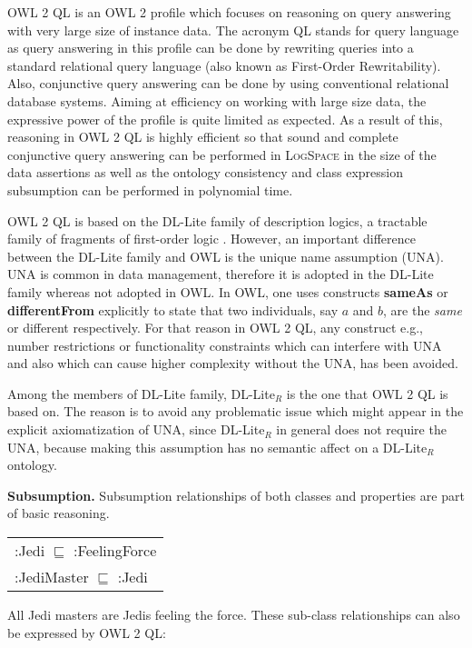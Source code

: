 \documentclass{llncs}
\newenvironment{DL}{
  \scriptsize
  \sffamily
  \vspace{0.3cm}
  \begin{tabular}{l}

}{
  \end{tabular}
  \linebreak
}
\begin{document}
OWL 2 QL is an OWL 2 profile which focuses on reasoning on query answering with very large size of instance data. The acronym QL stands for query language as query answering in this profile can be done by rewriting queries into a standard relational query language (also known as First-Order Rewritability). Also, conjunctive query answering can be done by using conventional relational database systems. Aiming at efficiency on working with large size data, the expressive power of the profile is quite limited as expected. As a result of this, reasoning in OWL 2 QL is highly efficient so that sound and complete conjunctive query answering can be performed in \textsc{LogSpace} in the size of the data assertions as well as  the ontology consistency and class expression subsumption can be performed in polynomial time.

OWL 2 QL is based on the DL-Lite family of description logics, a tractable family of fragments of first-order logic \cite{Artale2009,Calvanese2007}. 
However, an important difference between the DL-Lite family and OWL is the
unique name assumption (UNA). UNA is common in data management, therefore it is adopted in the DL-Lite family whereas not adopted in OWL. In OWL, one uses constructs \textbf{sameAs} or \textbf{differentFrom} explicitly to state that two individuals, say  $a$ and $b$, are the \emph{same} or {different} respectively. For that reason in OWL 2 QL, any construct e.g., number restrictions or functionality constraints which can interfere with UNA and also which can cause higher complexity without the UNA, has been avoided.


Among the members of DL-Lite family, DL-Lite$_R$ is the one that OWL 2 QL is based on. The reason is to avoid any problematic issue which might appear in the explicit axiomatization of UNA, since  DL-Lite$_R$ in general does not require the UNA, because making this assumption has no semantic affect on a DL-Lite$_R$ ontology. 

\textbf{Subsumption.}
Subsumption relationships of both classes and properties are part of basic reasoning.

\begin{DL}
:Jedi $\sqsubseteq$ :FeelingForce \\
:JediMaster $\sqsubseteq$ :Jedi \\
\end{DL}

All Jedi masters are Jedis feeling the force.
These sub-class relationships can also be expressed by OWL 2 QL:
\end{document}
